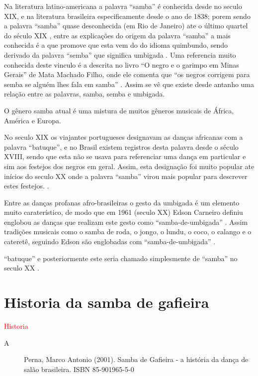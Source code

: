 Na literatura latino-americana a palavra ``samba'' é conhecida desde no seculo XIX, 
e na literatura brasileira especificamente desde o ano de 1838; porem sendo a palavra ``samba''
quase desconhecida (em Rio de Janeiro) ate o último quartel do século XIX  \cite[pp. 47]{diniz2008almanaque}\cite[pp. 86]{sandroni2001feitico},
entre as explicações
do origem da palavra ``samba'' a mais conhecida é a que promove que esta vem do 
do idioma quimbundo, sendo derivado da palavra ``semba''  que significa umbigada \cite[pp. 47]{diniz2008almanaque} \cite{da2015historia}.
Uma referencia muito conhecida deste vinculo é a descrita no livro ``O negro e o garimpo em Minas Gerais''
de Mata Machado Filho, onde ele comenta que ``os negros corrigem para semba se 
alguém lhes fala em samba'' \cite[pp. 85]{sandroni2001feitico}. Assim se vê que existe
desde antanho uma relação entre as palavras, 
samba, semba e umbigada.

O gênero samba atual é uma mistura de muitos gêneros musicais de África, América e Europa.


No seculo XIX os viajantes portugueses designavam as danças africanas com a palavra ``batuque'',
e no Brasil existem registros desta palavra desde o século XVIII, sendo que
esta não se usava para referenciar uma dança em particular e sim aos festejos dos negros em geral.
Assim, esta designação foi muito popular ate inícios do seculo XX onde a palavra ``samba''
 virou mais popular para descrever estes festejos. 
\cite[pp. 85]{sandroni2001feitico}.

Entre as danças profanas afro-brasileiras o gesto da umbigada é um elemento muito caraterístico,
de modo que em 1961 (seculo XX) Edson Carneiro definiu englobou as danças que realizam este 
gesto como ``samba-de-umbigada'' . Assim tradições 
musicais como o samba de roda, o jongo, o lundu, o coco, o calango e o cateretê, 
seguindo Edson são englobadas com  ``samba-de-umbigada'' \cite[pp. 85]{sandroni2001feitico}.

 ``batuque''
e posteriormente este seria chamado simplesmente de ``samba'' no seculo XX \cite[pp. 47]{diniz2008almanaque}.


\section{Historia da samba de gafieira}


\textcolor{red}{Historia}
\begin{description}

\item [A] Perna, Marco Antonio (2001). Samba de Gafieira - a história da dança de salão brasileira. ISBN 85-901965-5-0

\end{description}




